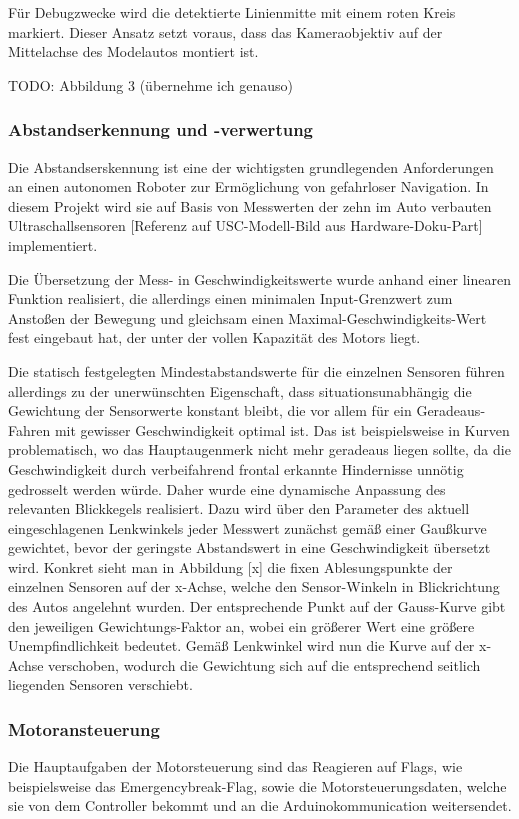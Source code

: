 \documentclass[12pt, a4paper]{scrartcl}
\begin{document}
Für Debugzwecke wird die detektierte Linienmitte mit einem roten Kreis markiert.
Dieser Ansatz setzt voraus, dass das Kameraobjektiv auf der Mittelachse des Modelautos montiert ist.

TODO: Abbildung 3 (übernehme ich genauso)
 

\subsubsection{Abstandserkennung und -verwertung}
Die Abstandserskennung ist eine der wichtigsten grundlegenden Anforderungen an einen autonomen Roboter zur Ermöglichung von gefahrloser Navigation. In diesem Projekt wird sie auf Basis von Messwerten der zehn im Auto verbauten Ultraschallsensoren [Referenz auf USC-Modell-Bild aus Hardware-Doku-Part] implementiert.

Die Übersetzung der Mess- in Geschwindigkeitswerte wurde anhand einer linearen Funktion realisiert, die allerdings einen minimalen Input-Grenzwert zum Anstoßen der Bewegung und gleichsam einen Maximal-Geschwindigkeits-Wert fest eingebaut hat, der unter der vollen Kapazität des Motors liegt.

Die statisch festgelegten Mindestabstandswerte für die einzelnen Sensoren führen allerdings zu der unerwünschten Eigenschaft, dass situationsunabhängig die Gewichtung der Sensorwerte konstant bleibt, die vor allem für ein Geradeaus-Fahren mit gewisser Geschwindigkeit optimal ist. Das ist beispielsweise in Kurven problematisch, wo das Hauptaugenmerk nicht mehr geradeaus liegen sollte, da die Geschwindigkeit durch verbeifahrend frontal erkannte Hindernisse unnötig gedrosselt werden würde. Daher wurde eine dynamische Anpassung des relevanten Blickkegels realisiert. Dazu wird über den Parameter des aktuell eingeschlagenen Lenkwinkels jeder Messwert zunächst gemäß einer Gaußkurve gewichtet, bevor der geringste Abstandswert in eine Geschwindigkeit übersetzt wird. Konkret sieht man in Abbildung [x] die fixen Ablesungspunkte der einzelnen Sensoren auf der x-Achse, welche den Sensor-Winkeln in Blickrichtung des Autos angelehnt wurden. Der entsprechende Punkt auf der Gauss-Kurve gibt den jeweiligen Gewichtungs-Faktor an, wobei ein größerer Wert eine größere Unempfindlichkeit bedeutet. Gemäß Lenkwinkel wird nun die Kurve auf der x-Achse verschoben, wodurch die Gewichtung sich auf die entsprechend seitlich liegenden Sensoren verschiebt.


\subsubsection{Motoransteuerung}
Die Hauptaufgaben der Motorsteuerung sind das Reagieren auf Flags, wie beispielsweise das Emergencybreak-Flag, sowie die Motorsteuerungsdaten, welche sie von dem Controller bekommt und an die Arduinokommunication weitersendet.
\end{document}
